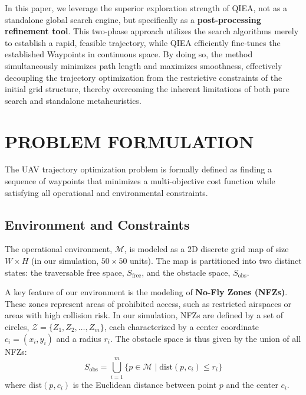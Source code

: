 In this paper, we leverage the superior exploration strength of QIEA, not as a standalone global search engine, but specifically as a \textbf{post-processing refinement tool}. This two-phase approach utilizes the search algorithms merely to establish a rapid, feasible trajectory, while QIEA efficiently fine-tunes the established Waypoints in continuous space. By doing so, the method simultaneously minimizes path length and maximizes smoothness, effectively decoupling the trajectory optimization from the restrictive constraints of the initial grid structure, thereby overcoming the inherent limitations of both pure search and standalone metaheuristics.

\section{PROBLEM FORMULATION}
\label{sec:problem_formulation}

The UAV trajectory optimization problem is formally defined as finding a sequence of waypoints that minimizes a multi-objective cost function while satisfying all operational and environmental constraints.


\subsection{Environment and Constraints}

The operational environment, $\mathcal{M}$, is modeled as a 2D discrete grid map of size $W \times H$ (in our simulation, $50 \times 50$ units). The map is partitioned into two distinct states: the traversable free space, $S_{\text{free}}$, and the obstacle space, $S_{\text{obs}}$.

A key feature of our environment is the modeling of \textbf{No-Fly Zones (NFZs)}. These zones represent areas of prohibited access, such as restricted airspaces or areas with high collision risk. In our simulation, NFZs are defined by a set of circles, $\mathcal{Z} = \{Z_1, Z_2, \ldots, Z_m\}$, each characterized by a center coordinate $c_i = (x_i, y_i)$ and a radius $r_i$. The obstacle space is thus given by the union of all NFZs:
\begin{equation}
    S_{\text{obs}} = \bigcup_{i=1}^{m} \{p \in \mathcal{M} \mid \text{dist}(p, c_i) \leq r_i\}
\end{equation}
where $\text{dist}(p, c_i)$ is the Euclidean distance between point $p$ and the center $c_i$.


